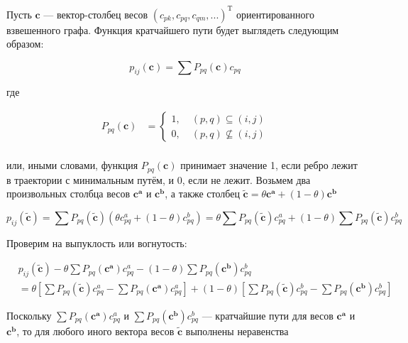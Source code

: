 	Пусть $\mathbf{c}$ --- вектор-столбец весов $(c_{pk}, c_{pq}, c_{qm}, ...)^{\text{T}}$ ориентированного взвешенного графа. Функция кратчайшего пути будет выглядеть следующим образом:
	
	\begin{equation}
	p_{ij}(\mathbf{c}) = \sum P_{pq}(\mathbf{c}) c_{pq}
	\end{equation}
	
	где 
	

	\begin{align}
	 P_{pq}(\mathbf{c}) &=
	\left\{
	\begin{aligned}
	1 ,\; & (p,q) \subseteq (i,j) \\
	0 ,\; & (p,q) \nsubseteq (i,j)
	\end{aligned}
	\right. \\
	\end{align}
	
	или, иными словами, функция $P_{pq}(\mathbf{c})$ принимает значение 1, если ребро лежит в траектории с минимальным путём, и 0, если не лежит. Возьмем два произвольных столбца весов $\mathbf{c^a}$ и $\mathbf{c^b}$, а также столбец $\mathbf{\tilde{c}} = \theta \mathbf{c^a} + (1-\theta)\mathbf{c^b}$
	
	\begin{equation}
	p_{ij}(\mathbf{\tilde{c}}) = \sum P_{pq}(\mathbf{\tilde{c}}) (\theta c_{pq}^a + (1 - \theta) c_{pq}^b) = \theta \sum P_{pq}(\mathbf{\tilde{c}}) c_{pq}^a + (1 - \theta) \sum P_{pq}(\mathbf{\tilde{c}})  c_{pq}^b 
	\end{equation}
	
	Проверим на выпуклость или вогнутость:

	\begin{equation}
	\begin{split}
	&p_{ij}(\mathbf{\tilde{c}}) - \theta \sum P_{pq}(\mathbf{c^a}) c_{pq}^a - (1 - \theta) \sum P_{pq}(\mathbf{c^b})  c_{pq}^b \\
	&= \theta \left[ \sum P_{pq}(\mathbf{\tilde{c}}) c_{pq}^a - \sum P_{pq}(\mathbf{c^a}) c_{pq}^a \right]  + (1 - \theta) \left[ \sum P_{pq}(\mathbf{\tilde{c}}) c_{pq}^b - \sum P_{pq}(\mathbf{c^b}) c_{pq}^b\right] 
	\end{split}
	\end{equation}
	
	Поскольку $\sum P_{pq}(\mathbf{c^a}) c_{pq}^a$ и $\sum P_{pq}(\mathbf{c^b}) c_{pq}^b$ --- кратчайшие пути для весов $\mathbf{c^a}$ и $\mathbf{c^b}$, то для любого иного вектора весов $\mathbf{\tilde{c}}$ выполнены неравенства
	
